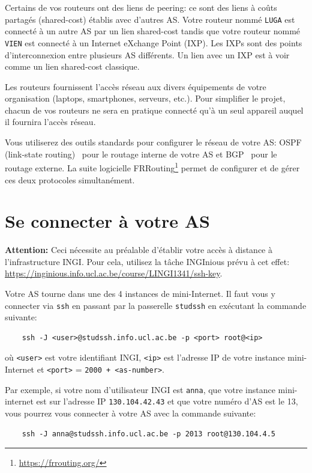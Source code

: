 \documentclass[a4paper, 11pt]{article}
\newcommand{\warning}[1]{\begin{hintBox} \textbf{Attention:} #1 \end{hintBox}}
\begin{document}
Certains de vos routeurs ont des liens de peering: ce sont
des liens à coûts partagés (shared-cost) établis avec d'autres AS.
Votre routeur nommé \texttt{LUGA} est connecté à un autre AS par un
lien shared-cost tandis que votre routeur nommé \texttt{VIEN} est
connecté à un Internet eXchange Point (IXP). Les IXPs sont des points
d'interconnexion entre plusieurs AS différents. Un lien avec un IXP
est à voir comme un lien shared-cost classique.

Les routeurs fournissent l'accès réseau aux divers équipements de votre
organisation (laptops, smartphones, serveurs, etc.). Pour simplifier
le projet, chacun de vos routeurs ne sera en pratique connecté qu'à un
seul appareil auquel il fournira l'accès réseau.

Vous utiliserez des outils standards pour configurer le réseau de votre
AS: OSPF (link-state routing)~\cite{rfc2328} pour le routage interne de votre AS et
BGP~\cite{rfc4271} pour le routage externe. La suite logicielle
FRRouting\footnote{\url{https://frrouting.org/}} permet de configurer
et de gérer ces deux protocoles simultanément.


\section{Se connecter à votre AS}

\warning{Ceci nécessite au préalable d'établir votre accès à distance à
l'infrastructure INGI. Pour cela, utilisez la tâche INGInious prévu à cet effet:
\url{https://inginious.info.ucl.ac.be/course/LINGI1341/ssh-key}.}

Votre AS tourne dans une des 4 instances de mini-Internet. Il
faut vous y connecter via \texttt{ssh} en passant par la passerelle
\texttt{studssh} en exécutant la commande suivante:
\begin{verbatim}
    ssh -J <user>@studssh.info.ucl.ac.be -p <port> root@<ip>
\end{verbatim}
où \texttt{<user>} est votre identifiant INGI, \texttt{<ip>} est
l'adresse IP de votre instance mini-Internet et \texttt{<port>}
= \texttt{2000 + <as-number>}.

Par exemple, si votre nom d'utilisateur INGI est \texttt{anna},
que votre instance mini-internet est sur l'adresse IP
\texttt{130.104.42.43} et que votre numéro d'AS est le 13,
vous pourrez vous connecter à votre AS avec la commande suivante:

\begin{verbatim}
    ssh -J anna@studssh.info.ucl.ac.be -p 2013 root@130.104.4.5
\end{verbatim}
\end{document}
